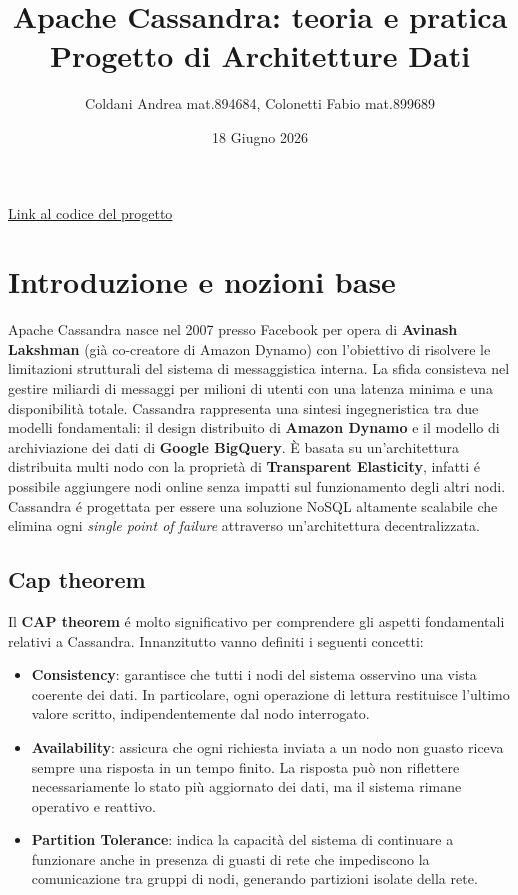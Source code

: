 \documentclass[12pt]{article}
\title{Apache Cassandra: teoria e pratica \\ \large Progetto di Architetture Dati}
\author{Coldani Andrea mat.894684, Colonetti Fabio mat.899689}
\date{18 Giugno 2026}
\begin{document}
\maketitle

\begin{center}
\href{https://github.com/mmorgulis/Progetto_AD}{Link al codice del progetto}
\end{center}

\vspace{1cm}
\tableofcontents
\newpage
 
\section{Introduzione e nozioni base}
Apache Cassandra nasce nel 2007 presso Facebook per opera di \textbf{Avinash Lakshman} (già co-creatore di Amazon Dynamo) con l'obiettivo di risolvere le limitazioni strutturali del sistema di messaggistica interna. La sfida consisteva nel gestire miliardi di messaggi per milioni di utenti con una latenza minima e una disponibilità totale. 
\newline\newline
Cassandra rappresenta una sintesi ingegneristica tra due modelli fondamentali: il design distribuito di \textbf{Amazon Dynamo} e il modello di archiviazione dei dati di \textbf{Google BigQuery}.\newline
È basata su un'architettura distribuita multi nodo con la proprietà di \textbf{Transparent Elasticity}, infatti é possibile aggiungere nodi online senza impatti sul funzionamento degli altri nodi.\newline
Cassandra é progettata per essere una soluzione NoSQL altamente scalabile che elimina ogni \textit{single point of failure} attraverso un'architettura decentralizzata.

\subsection{Cap theorem} \label{s_cap}
Il \textbf{CAP theorem} é molto significativo per comprendere gli aspetti fondamentali relativi a Cassandra.\newline
Innanzitutto vanno definiti i seguenti concetti:
\begin{itemize}
    \item \textbf{Consistency}: garantisce che tutti i nodi del sistema osservino una vista coerente dei dati. In particolare, ogni operazione di lettura restituisce l’ultimo valore scritto, indipendentemente dal nodo interrogato.

    \item \textbf{Availability}: assicura che ogni richiesta inviata a un nodo non guasto riceva sempre una risposta in un tempo finito. La risposta può non riflettere necessariamente lo stato più aggiornato dei dati, ma il sistema rimane operativo e reattivo.

    \item \textbf{Partition Tolerance}: indica la capacità del sistema di continuare a funzionare anche in presenza di guasti di rete che impediscono la comunicazione tra gruppi di nodi, generando partizioni isolate della rete.
\end{itemize}
\end{document}

